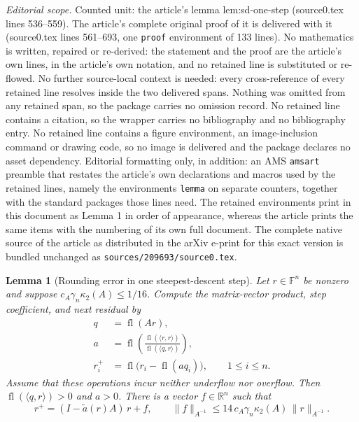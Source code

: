 \documentclass[10pt,a4paper]{amsart}
\newtheorem{lemma}{Lemma}
\newcommand{\R}{\mathbb{R}}
\newcommand{\fl}{\operatorname{fl}}
\begin{document}
\noindent\textit{Editorial scope.} Counted unit: the article's lemma lem:sd-one-step (source0.tex lines 536--559). The article's complete original proof of it is delivered with it (source0.tex lines 561--693, one \texttt{proof} environment of 133 lines). No mathematics is written, repaired or re-derived: the statement and the proof are the article's own lines, in the article's own notation, and no retained line is substituted or re-flowed.  No further source-local context is needed: every cross-reference of every retained line resolves inside the two delivered spans.  Nothing was omitted from any retained span, so the package carries no omission record.  No retained line contains a citation, so the wrapper carries no bibliography and no bibliography entry.  No retained line contains a figure environment, an image-inclusion command or drawing code, so no image is delivered and the package declares no asset dependency.  Editorial formatting only, in addition: an AMS \texttt{amsart} preamble that restates the article's own declarations and macros used by the retained lines, namely the environments \texttt{lemma} on separate counters, together with the standard packages those lines need.  The retained environments print in this document as Lemma 1 in order of appearance, whereas the article prints the same items with the numbering of its own full document.  The complete native source of the article as distributed in the arXiv e-print for this exact version is bundled unchanged as \texttt{sources/209693/source0.tex}.
\begin{lemma}[Rounding error in one steepest-descent step]
\label{lem:sd-one-step}
Let $r\in\mathbb F^n$ be nonzero and suppose
$c_A\gamma_n\kappa_2(A)\le1/16$.
Compute the matrix-vector product, step coefficient, and next residual by
\[
\begin{aligned}
 q&=\fl(Ar),\\
 a&=\fl\!\left(
       \frac{\fl(\langle r,r\rangle)}{\fl(\langle q,r\rangle)}
       \right),\\
 r_i^+&=\fl\bigl(r_i-\fl(aq_i)\bigr),\qquad 1\le i\le n.
\end{aligned}
\]
Assume that these operations incur neither underflow nor overflow.
Then $\fl(\langle q,r\rangle)>0$ and $a>0$.
There is a vector $f\in\R^n$ such that
\begin{equation}
 r^+=(I-\tilde a(r)A)\,r+f,
 \qquad
 \|f\|_{A^{-1}}\le14\,c_A\gamma_n\kappa_2(A)\,\|r\|_{A^{-1}} .
 \label{eq:sd-perturbed-step}
\end{equation}
\end{lemma}
\end{document}

